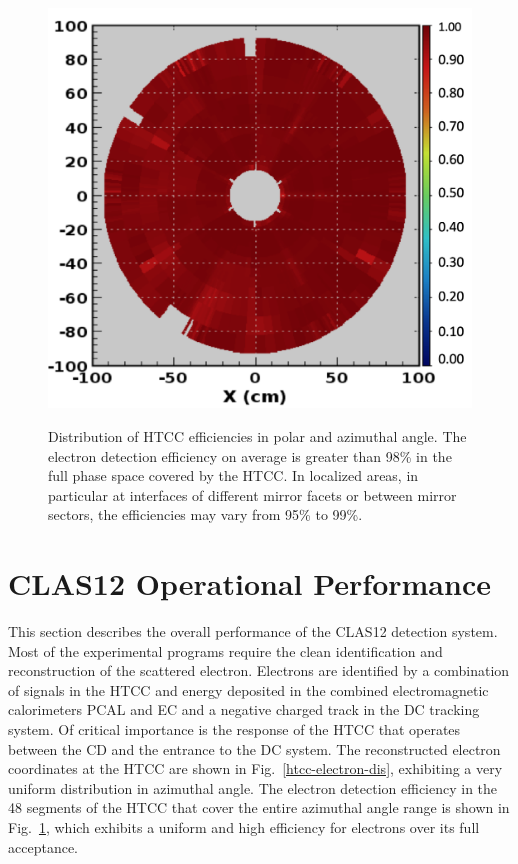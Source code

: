 \documentclass[final,3p,twocolumn]{elsarticle}
\begin{document}
\begin{figure}[t!]
{\includegraphics[width=0.96\columnwidth]{htcc-eff.png}}
\caption{Distribution of HTCC efficiencies in polar and azimuthal angle. The electron detection efficiency on
  average is greater than 98\% in the full phase space covered by the HTCC. In localized areas, in particular at
  interfaces of different mirror facets or between mirror sectors, the efficiencies may vary from 95\% to 99\%.} 
\label{htcc-efficiency}
\end{figure}

\section{CLAS12 Operational Performance}

This section describes the overall performance of the CLAS12 detection system. Most of the experimental
programs require the clean identification and reconstruction of the scattered electron. Electrons are identified
by a combination of signals in the HTCC and energy deposited in the combined electromagnetic calorimeters PCAL
and EC and a negative charged track in the DC tracking system. Of critical importance is the response of the HTCC
that operates between the CD and the entrance to the DC system. The reconstructed electron coordinates at the
HTCC are shown in Fig.~\ref{htcc-electron-dis}, exhibiting a very uniform distribution in azimuthal angle. The
electron detection efficiency in the 48 segments of the HTCC that cover the entire azimuthal angle range is shown
in Fig.~\ref{htcc-efficiency}, which exhibits a uniform and high efficiency for electrons over its full acceptance.
\end{document}
